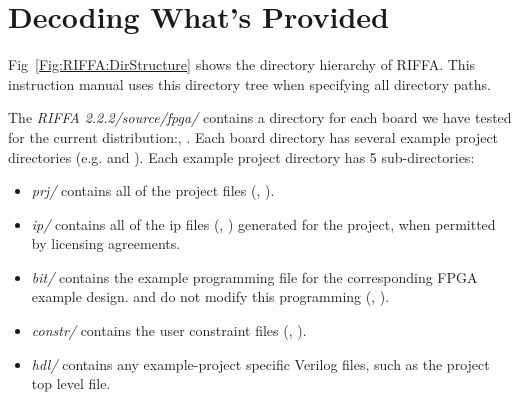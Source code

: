 \documentclass{refrep}
\newcommand{\RIFFAVer}{2.2.2}
\newcommand{\Directory}[1]{\textit{#1}}
\newcommand{\Xilinx}[1]{{\color{red}{#1}}}
\newcommand{\Altera}[1]{{\color{blue}{#1}}}
\begin{document}
\section{Decoding What's Provided}
\label{Sec:Intro:Decoding}
Fig~\ref{Fig:RIFFA:DirStructure} shows the directory hierarchy of RIFFA. This
instruction manual uses this directory tree when specifying all directory paths.

The \Directory{RIFFA \RIFFAVer/source/fpga/} contains a directory for each board
we have tested for the current distribution:\Altera{de5, de4}, \Xilinx{VC709,
  VC707, ZC706}. Each board directory has several example project directories
(e.g. \Altera{DE5Gen1x8If64} and \Xilinx{VC709\_Gen1x8If64}). Each example
project directory has 5 sub-directories:
\begin{itemize}
\item \Directory{prj/} contains all of the project files (\Altera{.qsf,.qpf}, \Xilinx{.xpr}).
\item \Directory{ip/} contains all of the ip files (\Altera{.qsys}, \Xilinx{.xci}) generated for the project, when permitted by licensing agreements.
\item \Directory{bit/} contains the example programming file for the corresponding FPGA example design. \Altera{Quartus} and \Xilinx{Vivado} do not modify this programming (\Altera{.sof}, \Xilinx{.bit}).
\item \Directory{constr/} contains the user constraint files (\Altera{.sdc}, \Xilinx{.xdc}).
\item \Directory{hdl/} contains any example-project specific Verilog files, such as the project top level file.
\end{itemize}
\end{document}
